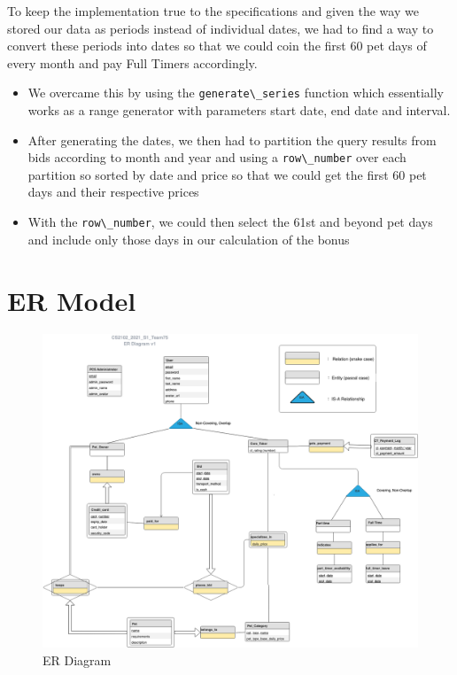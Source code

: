 \documentclass[
  paper=a4,
  ,captions=tableheading
]{scrartcl}
\newcommand{\passthrough}[1]{#1}
\providecommand{\tightlist}{%
  \setlength{\itemsep}{0pt}\setlength{\parskip}{0pt}}
\begin{document}
To keep the implementation true to the specifications and given the way
we stored our data as periods instead of individual dates, we had to
find a way to convert these periods into dates so that we could coin the
first 60 pet days of every month and pay Full Timers accordingly.

\begin{itemize}
\tightlist
\item
  We overcame this by using the
  \passthrough{\lstinline!generate\_series!} function which essentially
  works as a range generator with parameters start date, end date and
  interval.
\item
  After generating the dates, we then had to partition the query results
  from bids according to month and year and using a
  \passthrough{\lstinline!row\_number!} over each partition so sorted by
  date and price so that we could get the first 60 pet days and their
  respective prices
\item
  With the \passthrough{\lstinline!row\_number!}, we could then select
  the 61st and beyond pet days and include only those days in our
  calculation of the bonus
\end{itemize}

\hypertarget{er-model}{%
\section{ER Model}\label{er-model}}

\begin{figure}
\centering
\includegraphics{./er_diagram.png}
\caption{ER Diagram}
\end{figure}
\end{document}
